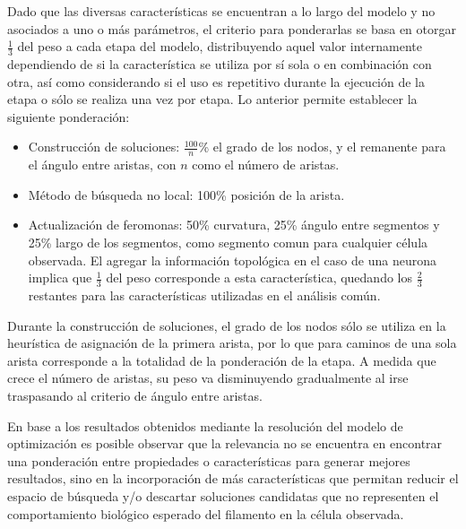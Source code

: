 Dado que las diversas caracter\'isticas se encuentran a lo largo del modelo y no asociados a uno o m\'as par\'ametros, el criterio para ponderarlas se basa en otorgar $\frac{1}{3}$ del peso a cada etapa del modelo, distribuyendo aquel valor internamente dependiendo de si la caracter\'istica se utiliza por s\'i sola o en combinaci\'on con otra, as\'i como considerando si el uso es repetitivo durante la ejecuci\'on de la etapa o s\'olo se realiza una vez por etapa. Lo anterior permite establecer la siguiente ponderaci\'on:

\begin{itemize}
    \item Construcci\'on de soluciones: $\frac{100}{n}$\% el grado de los nodos, y el remanente para el \'angulo entre aristas, con $n$ como el n\'umero de aristas.
    \item M\'etodo de b\'usqueda no local: 100\% posici\'on de la arista.
    \item Actualizaci\'on de feromonas: 50\% curvatura, 25\% \'angulo entre segmentos y 25\% largo de los segmentos, como segmento comun para cualquier c\'elula observada. El agregar la informaci\'on topol\'ogica en el caso de una neurona implica que $\frac{1}{3}$ del peso corresponde a esta caracter\'istica, quedando los $\frac{2}{3}$ restantes para las caracter\'isticas utilizadas en el an\'alisis com\'un. 
\end{itemize}

Durante la construcci\'on de soluciones, el grado de los nodos s\'olo se utiliza en la heur\'istica de asignaci\'on de la primera arista, por lo que para caminos de una sola arista corresponde a la totalidad de la ponderaci\'on de la etapa. A medida que crece el n\'umero de aristas, su peso va disminuyendo gradualmente al irse traspasando al criterio de \'angulo entre aristas.


En base a los resultados obtenidos mediante la resoluci\'on del modelo de optimizaci\'on es posible observar que la relevancia no se encuentra en encontrar una ponderaci\'on entre propiedades o caracter\'isticas para generar mejores resultados, sino en la incorporaci\'on de m\'as caracter\'isticas que permitan reducir el espacio de b\'usqueda y/o descartar soluciones candidatas que no representen el comportamiento biol\'ogico esperado del filamento en la c\'elula observada.

